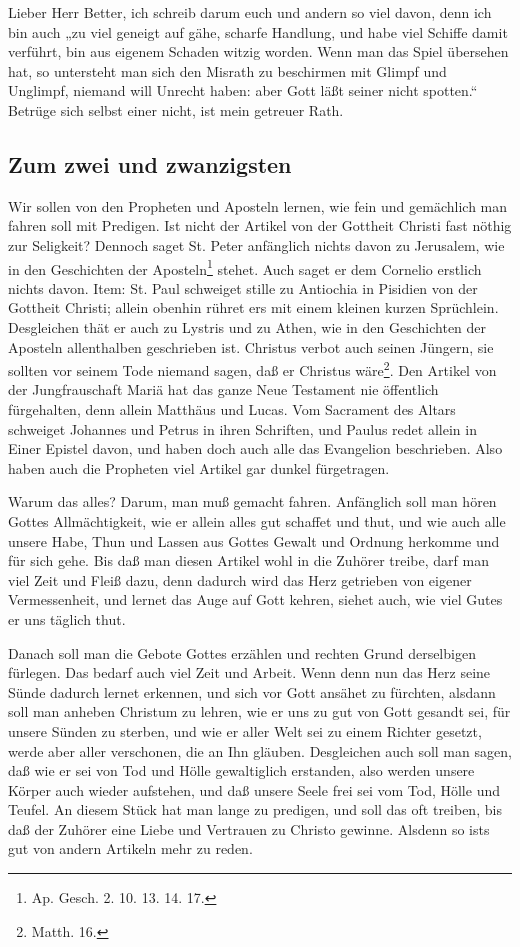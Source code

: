 Lieber Herr Better, ich schreib darum euch und andern so viel davon, denn ich bin auch „zu viel geneigt auf gähe, scharfe Handlung, und habe viel Schiffe damit verführt, bin aus eigenem Schaden witzig worden. Wenn man das Spiel übersehen hat, so untersteht man sich den Misrath zu beschirmen mit Glimpf und Unglimpf, niemand will Unrecht haben: aber Gott läßt seiner nicht spotten.“ Betrüge sich selbst einer nicht, ist mein getreuer Rath.

\subsection{Zum zwei und zwanzigsten}

Wir sollen von den Propheten und Aposteln lernen, wie fein und gemächlich man fahren soll mit Predigen. Ist nicht der Artikel von der Gottheit Christi fast nöthig zur Seligkeit? Dennoch saget St. Peter anfänglich nichts davon zu Jerusalem, wie in den Geschichten der Aposteln\footnote{Ap. Gesch. 2. 10. 13. 14. 17.} stehet. Auch saget er dem Cornelio erstlich nichts davon. Item: St. Paul schweiget stille zu Antiochia in Pisidien von der Gottheit Christi; allein obenhin rühret ers mit einem kleinen kurzen Sprüchlein. Desgleichen thät er auch zu Lystris und zu Athen, wie in den Geschichten der Aposteln allenthalben geschrieben ist. Christus verbot auch seinen Jüngern, sie sollten vor seinem Tode niemand sagen, daß er Christus wäre\footnote{Matth. 16.}. Den Artikel von der Jungfrauschaft Mariä hat das ganze Neue Testament nie öffentlich fürgehalten, denn allein Matthäus und Lucas. Vom Sacrament des Altars schweiget Johannes und Petrus in ihren Schriften, und Paulus redet allein in Einer Epistel davon, und haben doch auch alle das Evangelion beschrieben. Also haben auch die Propheten viel Artikel gar dunkel fürgetragen.

Warum das alles? Darum, man muß gemacht fahren. Anfänglich soll man hören Gottes Allmächtigkeit, wie er allein alles gut schaffet und thut, und wie auch alle unsere Habe, Thun und Lassen aus Gottes Gewalt und Ordnung herkomme und für sich gehe. Bis daß man diesen Artikel wohl in die Zuhörer treibe, darf man viel Zeit und Fleiß dazu, denn dadurch wird das Herz getrieben von eigener Vermessenheit, und lernet das Auge auf Gott kehren, siehet auch, wie viel Gutes er uns täglich thut.

Danach soll man die Gebote Gottes erzählen und rechten Grund derselbigen fürlegen. Das bedarf auch viel Zeit und Arbeit. Wenn denn nun das Herz seine Sünde dadurch lernet erkennen, und sich vor Gott ansähet zu fürchten, alsdann soll man anheben Christum zu lehren, wie er uns zu gut von Gott gesandt sei, für unsere Sünden zu sterben, und wie er aller Welt sei zu einem Richter gesetzt, werde aber aller verschonen, die an Ihn gläuben. Desgleichen auch soll man sagen, daß wie er sei von Tod und Hölle gewaltiglich erstanden, also werden unsere Körper auch wieder aufstehen, und daß unsere Seele frei sei vom Tod, Hölle und Teufel. An diesem Stück hat man lange zu predigen, und soll das oft treiben, bis daß der Zuhörer eine Liebe und Vertrauen zu Christo gewinne. Alsdenn so ists gut von andern Artikeln mehr zu reden.

